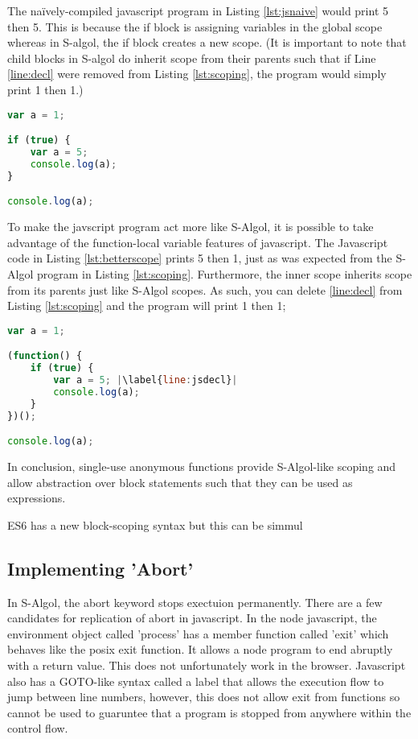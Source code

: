 \documentclass{article}
\begin{document}
The naïvely-compiled javascript program in Listing \ref{lst:jsnaive} would print 5 then 5. This is because the if block is assigning variables in the global scope whereas in S-algol, the if block creates a new scope. (It is important to note that child blocks in S-algol do inherit scope from their parents such that if Line \ref{line:decl} were removed from Listing \ref{lst:scoping}, the program would simply print 1 then 1.)

\begin{lstlisting}[caption={Javascript scoping},label={lst:jsnaive}, language=javascript, escapechar="|"]
var a = 1;

if (true) {
	var a = 5;
	console.log(a);
}

console.log(a);
\end{lstlisting}

To make the javscript program act more like S-Algol, it is possible to take advantage of the function-local variable features of javascript. The Javascript code in Listing \ref{lst:betterscope} prints 5 then 1, just as was expected from the S-Algol program in Listing \ref{lst:scoping}. Furthermore, the inner scope inherits scope from its parents just like S-Algol scopes. As such, you can delete \ref{line:decl} from Listing \ref{lst:scoping} and the program will print 1 then 1;

\begin{lstlisting}[caption={S-Algol-like Javascript scoping},label={lst:betterscope}, language=javascript, escapechar="|"]
var a = 1;

(function() {
	if (true) {
		var a = 5; |\label{line:jsdecl}|
		console.log(a);
	}
})();

console.log(a);
\end{lstlisting}

In conclusion, single-use anonymous functions provide S-Algol-like scoping and allow abstraction over block statements such that they can be used as expressions.


ES6 has a new block-scoping syntax but this can be simmul


\subsection{Implementing 'Abort'}

In S-Algol, the abort keyword stops exectuion permanently. There are a few candidates for replication of abort in javascript. In the node javascript, the environment object called 'process' has a member function called 'exit' which behaves like the posix exit function. It allows a node program to end abruptly with a return value. This does not unfortunately work in the browser. Javascript also has a GOTO-like syntax called a label that allows the execution flow to jump between line numbers, however, this does not allow exit from functions so cannot be used to guaruntee that a program is stopped from anywhere within the control flow.
\end{document}
